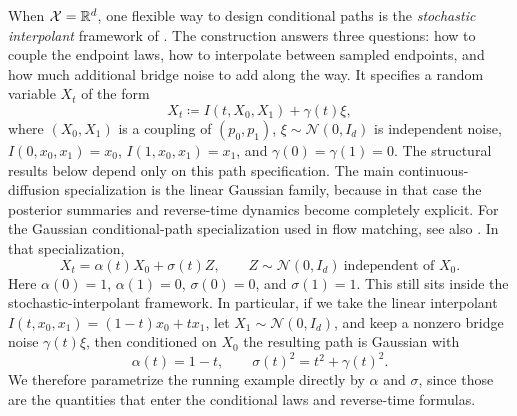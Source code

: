 When \(\mathcal{X}=\mathbb{R}^d\), one flexible way to design conditional paths is the \emph{stochastic interpolant} framework of \citet[Def.~1]{albergo_boffi_vanden_eijnden_2025_stochastic_interpolants}.
The construction answers three questions:
how to couple the endpoint laws, how to interpolate between sampled endpoints, and how much additional bridge noise to add along the way.
It specifies a random variable \(X_t\) of the form
\begin{equation}
  X_t \coloneqq I(t,X_0,X_1) + \gamma(t)\xi,
  \label{eq:stochastic-interpolant-bridge}
\end{equation}
where \((X_0,X_1)\) is a coupling of \((p_0,p_1)\), \(\xi\sim\mathcal{N}(0,I_d)\) is independent noise, \(I(0,x_0,x_1)=x_0\), \(I(1,x_0,x_1)=x_1\), and \(\gamma(0)=\gamma(1)=0\).
The structural results below depend only on this path specification.
The main continuous-diffusion specialization is the linear Gaussian family, because in that case the posterior summaries and reverse-time dynamics become completely explicit.
For the Gaussian conditional-path specialization used in flow matching, see also \citet[\S\S3.1 and 4]{lipman_chen_ben_hamu_nickel_le_2023_flow_matching}.
In that specialization,
\begin{equation}
  X_t = \alpha(t)X_0 + \sigma(t) Z,
  \qquad
  Z\sim\mathcal{N}(0,I_d)\ \text{independent of }X_0.
  \label{eq:gaussian-bridge-path}
\end{equation}
Here \(\alpha(0)=1\), \(\alpha(1)=0\), \(\sigma(0)=0\), and \(\sigma(1)=1\).
This still sits inside the stochastic-interpolant framework.
In particular, if we take the linear interpolant \(I(t,x_0,x_1)=(1-t)x_0+tx_1\), let \(X_1\sim\mathcal{N}(0,I_d)\), and keep a nonzero bridge noise \(\gamma(t)\xi\), then conditioned on \(X_0\) the resulting path is Gaussian with
\[
  \alpha(t)=1-t,
  \qquad
  \sigma(t)^2=t^2+\gamma(t)^2.
\]
We therefore parametrize the running example directly by \(\alpha\) and \(\sigma\), since those are the quantities that enter the conditional laws and reverse-time formulas.

